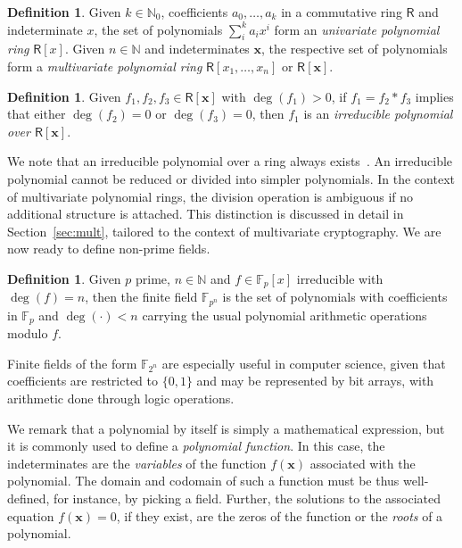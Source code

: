 \documentclass[12pt, a4paper, oneside]{memoir}
\theoremstyle{definition}
\newtheorem{definition}[theorem]{Definition}
\begin{document}
\begin{definition}
  Given $k \in \mathbb{N}_{0}$, coefficients $a_{0}, \dots, a_{k}$ in a commutative ring $\mathsf{R}$ and indeterminate $x$, the set of polynomials $\sum_{i}^{k} a_{i} x^{i}$ form an \emph{univariate polynomial ring} $\mathsf{R}[x]$. Given $n \in \mathbb{N}$ and indeterminates $\mathbf{x}$, the respective set of polynomials form a \emph{multivariate polynomial ring} $\mathsf{R}[x_{1}, \dots, x_{n}]$ or $\mathsf{R}[\mathbf{x}]$.
\end{definition}

\begin{definition}
  Given $f_{1}, f_{2}, f_{3} \in \mathsf{R}[\mathbf{x}]$ with $\deg(f_{1}) > 0$, if $f_{1} = f_{2} \ast f_{3}$ implies that either $\deg(f_{2}) = 0$ or $\deg(f_{3}) = 0$, then $f_{1}$ is an \emph{irreducible polynomial over $\mathsf{R}[\mathbf{x}]$}.
\end{definition}

We note that an irreducible polynomial over a ring always exists~\cite[Remark~2.1.25]{Mullen:2013}. An irreducible polynomial cannot be reduced or divided into simpler polynomials. In the context of multivariate polynomial rings, the division operation is ambiguous if no additional structure is attached. This distinction is discussed in detail in Section~\ref{sec:mult}, tailored to the context of multivariate cryptography. We are now ready to define non-prime fields.

\begin{definition}
  Given $p$ prime, $n \in \mathbb{N}$ and $f \in \mathbb{F}_{p}[x]$ irreducible with $\deg(f) = n$, then the finite field $\mathbb{F}_{p^{n}}$ is the set of polynomials with coefficients in $\mathbb{F}_{p}$ and $\deg(\cdot) < n$ carrying the usual polynomial arithmetic operations modulo $f$.
\end{definition}

Finite fields of the form $\mathbb{F}_{2^{n}}$ are especially useful in computer science, given that coefficients are restricted to $\{0, 1\}$ and may be represented by bit arrays, with arithmetic done through logic operations.

We remark that a polynomial by itself is simply a mathematical expression, but it is commonly used to define a \emph{polynomial function}. In this case, the indeterminates are the \emph{variables} of the function $f(\mathbf{x})$ associated with the polynomial. The domain and codomain of such a function must be thus well-defined, for instance, by picking a field. Further, the solutions to the associated equation $f(\mathbf{x}) = 0$, if they exist, are the zeros of the function or the \emph{roots} of a polynomial.
\end{document}
